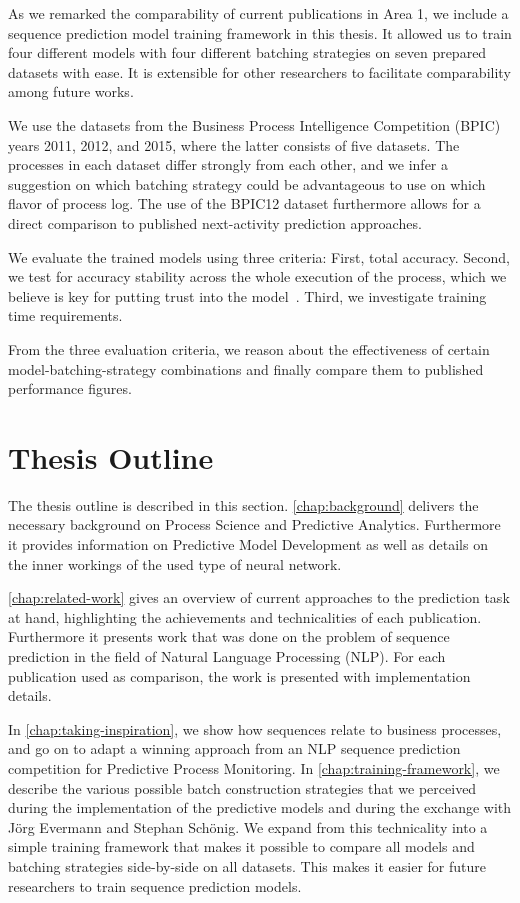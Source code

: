 As we remarked the comparability of current publications in Area 1, we include a sequence prediction model training framework in this thesis. It allowed us to train four different models with four different batching strategies on seven prepared datasets with ease. It is extensible for other researchers to facilitate comparability among future works.

We use the datasets from the Business Process Intelligence Competition (BPIC) years 2011, 2012, and 2015, where the latter consists of five datasets. The processes in each dataset differ strongly from each other, and we infer a suggestion on which batching strategy could be advantageous to use on which flavor of process log. The use of the BPIC12 dataset furthermore allows for a direct comparison to published next-activity prediction approaches.

We evaluate the trained models using three criteria: First, total accuracy. Second, we test for accuracy stability across the whole execution of the process, which we believe is key for putting trust into the model~\cite{francescomarino2015, boehmer2018probability}. Third, we investigate training time requirements.

From the three evaluation criteria, we reason about the effectiveness of certain model-batching-strategy combinations and finally compare them to published performance figures.

\section{Thesis Outline}\label{sec:intro:outline}
The thesis outline is described in this section. \autoref{chap:background} delivers the necessary background on Process Science and Predictive Analytics. Furthermore it provides information on Predictive Model Development as well as details on the inner workings of the used type of neural network.

\autoref{chap:related-work} gives an overview of current approaches to the prediction task at hand, highlighting the achievements and technicalities of each publication. Furthermore it presents work that was done on the problem of sequence prediction in the field of Natural Language Processing (NLP). For each publication used as comparison, the work is presented with implementation details.

In \autoref{chap:taking-inspiration}, we show how sequences relate to business processes, and go on to adapt a winning approach from an NLP sequence prediction competition for Predictive Process Monitoring. In \autoref{chap:training-framework}, we describe the various possible batch construction strategies that we perceived during the implementation of the predictive models and during the exchange with Jörg Evermann and Stephan Schönig. We expand from this technicality into a simple training framework that makes it possible to compare all models and batching strategies side-by-side on all datasets. This makes it easier for future researchers to train sequence prediction models.

